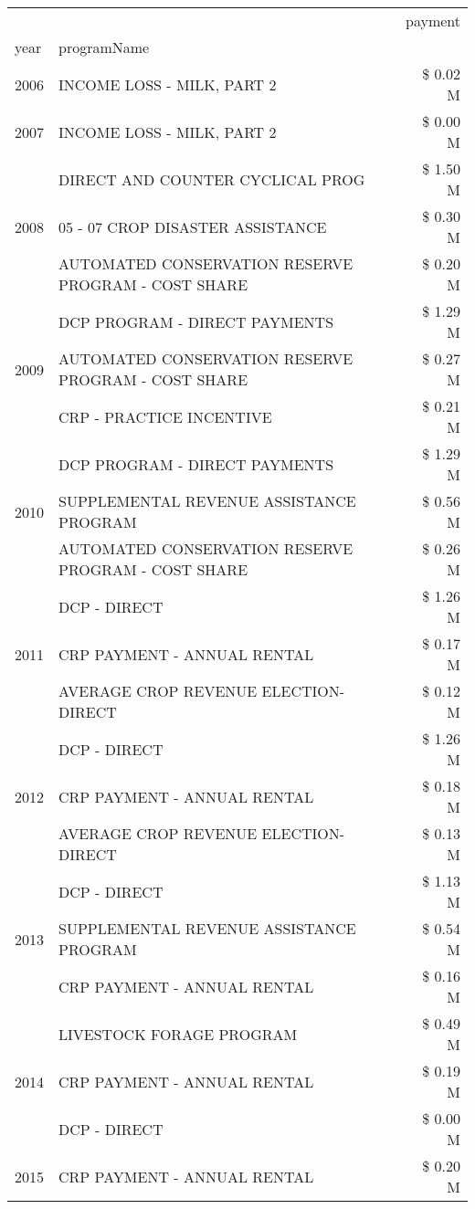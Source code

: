 \begin{tabular}{llr}
\toprule
 &  & payment \\
year & programName &  \\
\midrule
2006 & INCOME LOSS - MILK, PART 2 & \$ 0.02 M \\
\cline{1-3}
2007 & INCOME LOSS - MILK, PART 2 & \$ 0.00 M \\
\cline{1-3}
\multirow[t]{3}{*}{2008} & DIRECT AND COUNTER CYCLICAL PROG & \$ 1.50 M \\
 & 05 - 07 CROP DISASTER ASSISTANCE & \$ 0.30 M \\
 & AUTOMATED CONSERVATION RESERVE PROGRAM - COST SHARE & \$ 0.20 M \\
\cline{1-3}
\multirow[t]{3}{*}{2009} & DCP PROGRAM - DIRECT PAYMENTS & \$ 1.29 M \\
 & AUTOMATED CONSERVATION RESERVE PROGRAM - COST SHARE & \$ 0.27 M \\
 & CRP - PRACTICE INCENTIVE & \$ 0.21 M \\
\cline{1-3}
\multirow[t]{3}{*}{2010} & DCP PROGRAM - DIRECT PAYMENTS & \$ 1.29 M \\
 & SUPPLEMENTAL REVENUE ASSISTANCE PROGRAM & \$ 0.56 M \\
 & AUTOMATED CONSERVATION RESERVE PROGRAM - COST SHARE & \$ 0.26 M \\
\cline{1-3}
\multirow[t]{3}{*}{2011} & DCP - DIRECT & \$ 1.26 M \\
 & CRP PAYMENT - ANNUAL RENTAL & \$ 0.17 M \\
 & AVERAGE CROP REVENUE ELECTION-DIRECT & \$ 0.12 M \\
\cline{1-3}
\multirow[t]{3}{*}{2012} & DCP - DIRECT & \$ 1.26 M \\
 & CRP PAYMENT - ANNUAL RENTAL & \$ 0.18 M \\
 & AVERAGE CROP REVENUE ELECTION-DIRECT & \$ 0.13 M \\
\cline{1-3}
\multirow[t]{3}{*}{2013} & DCP - DIRECT & \$ 1.13 M \\
 & SUPPLEMENTAL REVENUE ASSISTANCE PROGRAM & \$ 0.54 M \\
 & CRP PAYMENT - ANNUAL RENTAL & \$ 0.16 M \\
\cline{1-3}
\multirow[t]{3}{*}{2014} & LIVESTOCK FORAGE PROGRAM & \$ 0.49 M \\
 & CRP PAYMENT - ANNUAL RENTAL & \$ 0.19 M \\
 & DCP - DIRECT & \$ 0.00 M \\
\cline{1-3}
\multirow[t]{2}{*}{2015} & CRP PAYMENT - ANNUAL RENTAL & \$ 0.20 M \\

\end{tabular}
